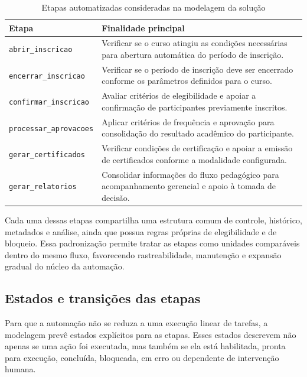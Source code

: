 \begin{table}[H]
\centering
\caption{Etapas automatizadas consideradas na modelagem da solução}
\label{tab:etapas-modelagem-automacao}
\begin{tabular}{p{4cm} p{9cm}}
\hline
\textbf{Etapa} & \textbf{Finalidade principal} \\
\hline
\texttt{abrir\_inscricao} & Verificar se o curso atingiu as condições necessárias para abertura automática do período de inscrição. \\
\hline
\texttt{encerrar\_inscricao} & Verificar se o período de inscrição deve ser encerrado conforme os parâmetros definidos para o curso. \\
\hline
\texttt{confirmar\_inscricao} & Avaliar critérios de elegibilidade e apoiar a confirmação de participantes previamente inscritos. \\
\hline
\texttt{processar\_aprovacoes} & Aplicar critérios de frequência e aprovação para consolidação do resultado acadêmico do participante. \\
\hline
\texttt{gerar\_certificados} & Verificar condições de certificação e apoiar a emissão de certificados conforme a modalidade configurada. \\
\hline
\texttt{gerar\_relatorios} & Consolidar informações do fluxo pedagógico para acompanhamento gerencial e apoio à tomada de decisão. \\
\hline
\end{tabular}
\end{table}

Cada uma dessas etapas compartilha uma estrutura comum de controle,
histórico, metadados e análise, ainda que possua regras próprias de
elegibilidade e de bloqueio. Essa padronização permite tratar as etapas
como unidades comparáveis dentro do mesmo fluxo, favorecendo
rastreabilidade, manutenção e expansão gradual do núcleo da automação.

\subsection{Estados e transições das etapas}
\label{sec:metod:modelagem:estados}

Para que a automação não se reduza a uma execução linear de tarefas, a
modelagem prevê estados explícitos para as etapas. Esses estados
descrevem não apenas se uma ação foi executada, mas também se ela está
habilitada, pronta para execução, concluída, bloqueada, em erro ou
dependente de intervenção humana.

